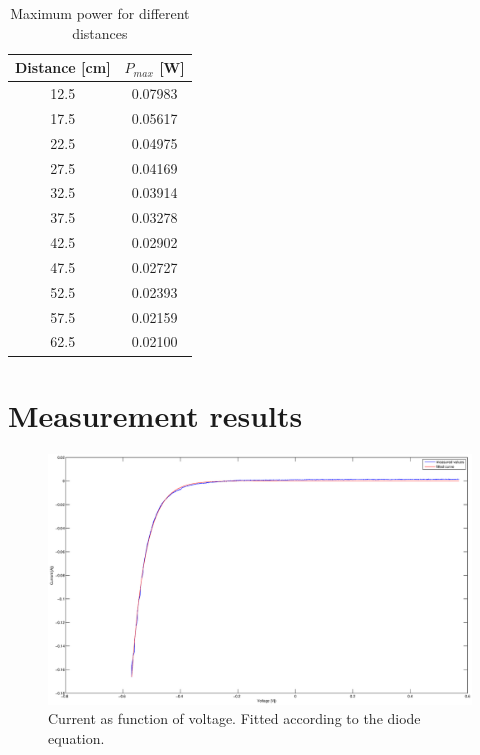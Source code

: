 \documentclass[a4paper]{article}
\begin{document}
\begin{table}
  \centering
  \begin{tabular}{|c|c|}
    \hline
    Distance [cm] & $P_{max}$ [W] \\
    \hline
    12.5 & 0.07983 \\
    17.5 & 0.05617 \\
    22.5 & 0.04975 \\
    27.5 & 0.04169 \\
    32.5 & 0.03914 \\
    37.5 & 0.03278 \\
    42.5 & 0.02902 \\
    47.5 & 0.02727 \\
    52.5 & 0.02393 \\
    57.5 & 0.02159 \\
    62.5 & 0.02100 \\
    \hline
  \end{tabular}
  \caption{Maximum power for different distances}
  \label{tab}
\end{table}

\newpage
\section{Measurement results}
\vfill
\begin{figure}[h!]
  \begin{center}
    \includegraphics[scale=0.25]{IvsUnoIlumination.eps}
  \end{center}
  \caption{Current as function of voltage. Fitted according to the diode equation.}
  \label{ivsun}
\end{figure}
\end{document}
